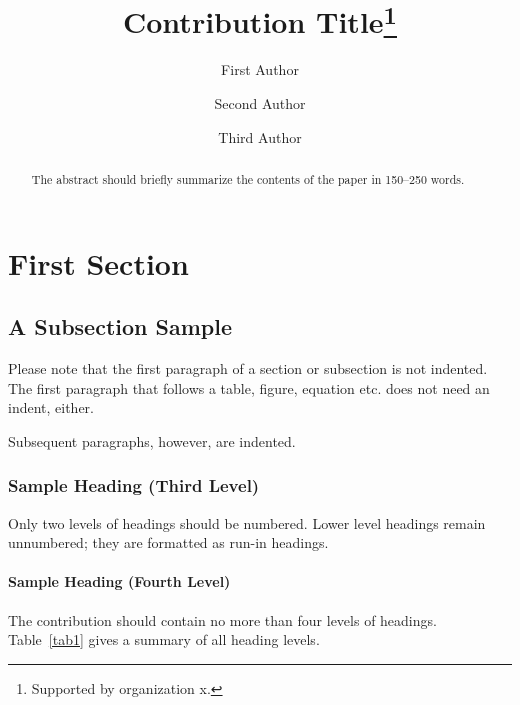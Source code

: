 \documentclass[runningheads]{llncs}
\begin{document}
%
\title{Contribution Title\thanks{Supported by organization x.}}
%
%
\author{First Author \and
  Second Author \and
  Third Author}
%
%
%
\maketitle              %
%
\begin{abstract}
  The abstract should briefly summarize the contents of the paper in
  150--250 words.

\end{abstract}
%
%
%
\section{First Section}
\subsection{A Subsection Sample}
Please note that the first paragraph of a section or subsection is
not indented. The first paragraph that follows a table, figure,
equation etc. does not need an indent, either.

Subsequent paragraphs, however, are indented.

\subsubsection{Sample Heading (Third Level)} Only two levels of
headings should be numbered. Lower level headings remain unnumbered;
they are formatted as run-in headings.

\paragraph{Sample Heading (Fourth Level)}
The contribution should contain no more than four levels of
headings. Table~\ref{tab1} gives a summary of all heading levels.
\end{document}
